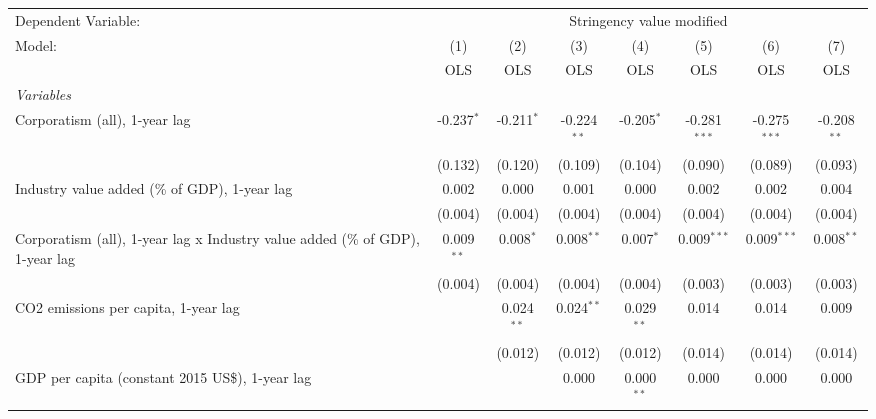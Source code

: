 
\begingroup
\centering
\begin{tabular}{lccccccc}
   \toprule
   Dependent Variable: & \multicolumn{7}{c}{Stringency value modified}\\
   Model:                                                                        & (1)          & (2)          & (3)           & (4)          & (5)            & (6)            & (7)\\  
                                                                                 &  OLS         & OLS          & OLS           & OLS          & OLS            & OLS            & OLS\\  
   \midrule
   \emph{Variables}\\
   Corporatism (all), 1-year lag                                                 & -0.237$^{*}$ & -0.211$^{*}$ & -0.224$^{**}$ & -0.205$^{*}$ & -0.281$^{***}$ & -0.275$^{***}$ & -0.208$^{**}$\\   
                                                                                 & (0.132)      & (0.120)      & (0.109)       & (0.104)      & (0.090)        & (0.089)        & (0.093)\\   
   Industry value added (\% of GDP), 1-year lag                                  & 0.002        & 0.000        & 0.001         & 0.000        & 0.002          & 0.002          & 0.004\\   
                                                                                 & (0.004)      & (0.004)      & (0.004)       & (0.004)      & (0.004)        & (0.004)        & (0.004)\\   
   Corporatism (all), 1-year lag x Industry value added (\% of GDP), 1-year lag  & 0.009$^{**}$ & 0.008$^{*}$  & 0.008$^{**}$  & 0.007$^{*}$  & 0.009$^{***}$  & 0.009$^{***}$  & 0.008$^{**}$\\   
                                                                                 & (0.004)      & (0.004)      & (0.004)       & (0.004)      & (0.003)        & (0.003)        & (0.003)\\   
   CO2 emissions per capita, 1-year lag                                          &              & 0.024$^{**}$ & 0.024$^{**}$  & 0.029$^{**}$ & 0.014          & 0.014          & 0.009\\   
                                                                                 &              & (0.012)      & (0.012)       & (0.012)      & (0.014)        & (0.014)        & (0.014)\\   
   GDP per capita (constant 2015 US\$), 1-year lag                               &              &              & 0.000         & 0.000$^{**}$ & 0.000          & 0.000          & 0.000\\   

\end{tabular}
